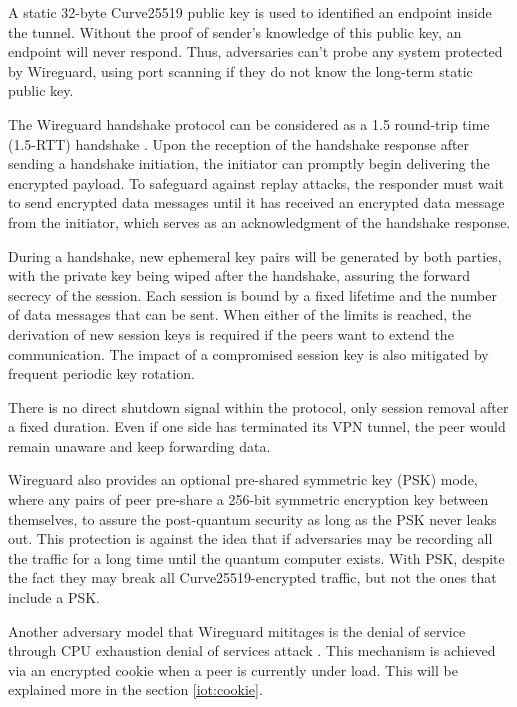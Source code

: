  A static 32-byte Curve25519 \cite{curve} public key is used to identified an endpoint inside the tunnel. Without the
 proof of sender's knowledge of this public key, an endpoint will never respond. Thus, adversaries can't
 probe any system protected by Wireguard, using port scanning if they do not know the long-term static 
 public key.

The Wireguard handshake protocol can be considered as a 1.5 round-trip time (1.5-RTT) handshake \cite{pwu}. 
Upon the reception of the handshake response after sending a handshake initiation, the initiator
can promptly begin delivering the encrypted payload. To safeguard against replay attacks, 
the responder must wait to send encrypted data messages until it has received an encrypted data 
message from the initiator, which serves as an acknowledgment of the handshake response.

During a handshake, new ephemeral key pairs will be generated by both parties, with the private key
being wiped after the handshake, assuring the forward secrecy of the session. Each session is bound
by a fixed lifetime and the number of data messages that can be sent. When either of the limits is reached,
the derivation of new session keys is required if the peers want to extend the communication. The impact
of a compromised session key is also mitigated by frequent periodic key rotation.

There is no direct shutdown signal within the protocol, only session removal after a fixed duration.
Even if one side has terminated its VPN tunnel, the peer would remain unaware and 
keep forwarding data.

Wireguard also provides an optional pre-shared symmetric key (PSK) mode, where any pairs of peer
pre-share a 256-bit symmetric encryption key between themselves, to assure the post-quantum 
security as long as the PSK never leaks out. This protection is against the idea that if 
adversaries may be recording all the traffic for a long time until the quantum computer exists.
With PSK, despite the fact they may break all Curve25519-encrypted traffic, but not the ones that
include a PSK.

Another adversary model that Wireguard mititages is the denial of service through CPU exhaustion denial
of services attack \cite[p.~268]{cpu}. This mechanism is achieved via an encrypted cookie when a peer is currently 
under load. This will be explained more in the section \ref{iot:cookie}.

